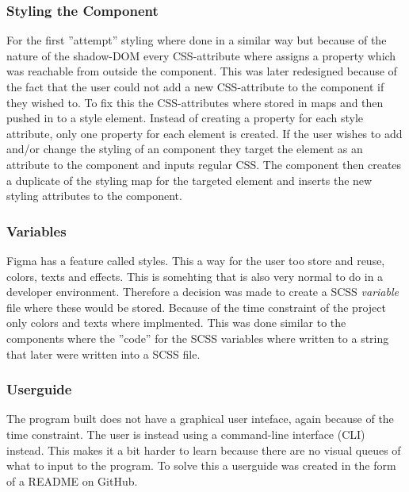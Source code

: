 \subsubsection{Styling the Component}%
\label{ssub:Styling the component}
For the first ''attempt'' styling where done in a similar way but because of the nature of the shadow-DOM every CSS-attribute where assigns a property which was reachable from outside the component. This was later redesigned because of the fact that the user could not add a new CSS-attribute to the component if they wished to. To fix this the CSS-attributes where stored in maps \cite{ArrayPrototypeMap} and then pushed in to a style element. Instead of creating a property for each style attribute, only one property for each element is created. If the user wishes to add and/or change the styling of an component they target the element as an attribute to the component and inputs regular CSS. The component then creates a duplicate of the styling map for the targeted element and inserts the new styling attributes to the component.


\subsubsection{Variables}%
\label{ssub:Variables}
Figma has a feature called styles. This a way for the user too store and reuse, colors, texts and effects. This is somehting that is also very normal to do in a developer environment. Therefore a decision was made to create a SCSS \textit{variable} file where these would be stored. Because of the time constraint of the project only colors and texts where implmented. This was done similar to the components where the ''code'' for the SCSS variables where written to a string that later were written into a SCSS file. 


\subsubsection{Userguide}%
\label{ssub:Userguide}
The program built does not have a graphical user inteface, again because of the time constraint. The user is instead using a command-line interface (CLI) instead. This makes it a bit harder to learn because there are no visual queues of what to input to the program. To solve this a userguide was created in the form of a README on GitHub\cite{BuildSoftwareBetter}. 








